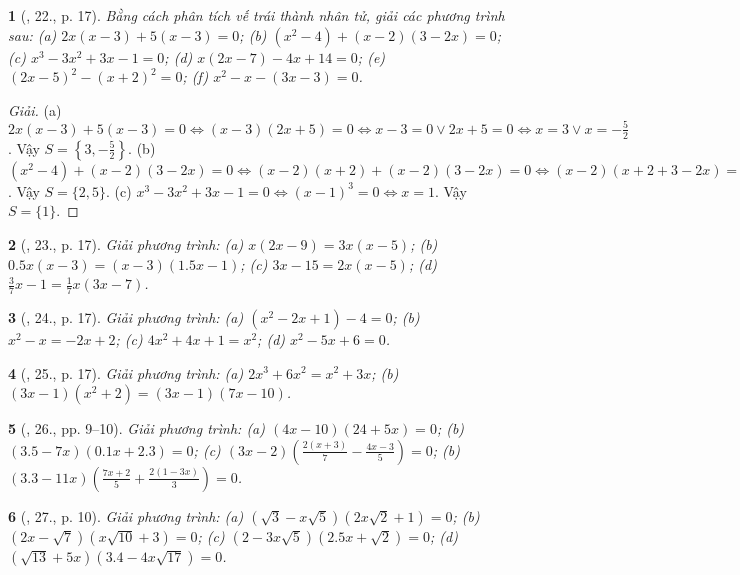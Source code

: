 \documentclass{article}
\newtheorem{baitoan}{}
\begin{document}
\begin{baitoan}[\cite{SGK_Toan_8_tap_2}, 22., p. 17]
	Bằng cách phân tích vế trái thành nhân tử, giải các phương trình sau: (a) $2x(x - 3) + 5(x - 3) = 0$; (b) $(x^2 - 4) + (x - 2)(3 - 2x) = 0$; (c) $x^3 - 3x^2 + 3x - 1 = 0$; (d) $x(2x - 7) - 4x + 14 = 0$; (e) $(2x - 5)^2 - (x + 2)^2 = 0$; (f) $x^2 - x - (3x - 3) = 0$.
\end{baitoan}

\begin{proof}[Giải]
	(a) $2x(x - 3) + 5(x - 3) = 0\Leftrightarrow(x - 3)(2x + 5) = 0\Leftrightarrow x - 3 = 0\lor2x + 5 = 0\Leftrightarrow x = 3\lor x = -\frac{5}{2}$. Vậy $S = \left\{3,-\frac{5}{2}\right\}$. (b) $(x^2 - 4) + (x - 2)(3 - 2x) = 0\Leftrightarrow(x - 2)(x + 2) + (x - 2)(3 - 2x) = 0\Leftrightarrow(x - 2)(x + 2 + 3 - 2x) = 0\Leftrightarrow(x - 2)(5 - x) = 0\Leftrightarrow x = 2\lor x = 5$. Vậy $S = \{2,5\}$. (c) $x^3 - 3x^2 + 3x - 1 = 0\Leftrightarrow(x - 1)^3 = 0\Leftrightarrow x = 1$. Vậy $S = \{1\}$.
\end{proof}

\begin{baitoan}[\cite{SGK_Toan_8_tap_2}, 23., p. 17]
	Giải phương trình: (a) $x(2x - 9) = 3x(x - 5)$; (b) $0.5x(x - 3) = (x - 3)(1.5x - 1)$; (c) $3x - 15 = 2x(x - 5)$; (d) $\frac{3}{7}x - 1 = \frac{1}{7}x(3x - 7)$.
\end{baitoan}

\begin{baitoan}[\cite{SGK_Toan_8_tap_2}, 24., p. 17]
	Giải phương trình: (a) $(x^2 - 2x + 1) - 4 = 0$; (b) $x^2 - x = -2x + 2$; (c) $4x^2 + 4x + 1 = x^2$; (d) $x^2 - 5x + 6 = 0$.
\end{baitoan}

\begin{baitoan}[\cite{SGK_Toan_8_tap_2}, 25., p. 17]
	Giải phương trình: (a) $2x^3 + 6x^2 = x^2 + 3x$; (b) $(3x - 1)(x^2 + 2) = (3x - 1)(7x - 10)$.
\end{baitoan}

\begin{baitoan}[\cite{SBT_Toan_8_tap_2}, 26., pp. 9--10]
	Giải phương trình: (a) $(4x - 10)(24 + 5x) = 0$; (b) $(3.5 - 7x)(0.1x + 2.3) = 0$; (c) $(3x - 2)\left(\frac{2(x + 3)}{7} - \frac{4x - 3}{5}\right) = 0$; (b) $(3.3 - 11x)\left(\frac{7x + 2}{5} + \frac{2(1 - 3x)}{3}\right) = 0$.
\end{baitoan}

\begin{baitoan}[\cite{SBT_Toan_8_tap_2}, 27., p. 10]
	Giải phương trình: (a) $(\sqrt{3} - x\sqrt{5})(2x\sqrt{2} + 1) = 0$; (b) $(2x - \sqrt{7})(x\sqrt{10} + 3) = 0$; (c) $(2 - 3x\sqrt{5})(2.5x + \sqrt{2}) = 0$; (d) $(\sqrt{13} + 5x)(3.4 - 4x\sqrt{17}) = 0$.
\end{baitoan}
\end{document}
